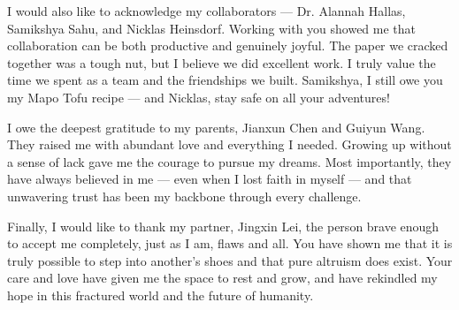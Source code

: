 I would also like to acknowledge my collaborators — Dr. Alannah Hallas, Samikshya Sahu, and Nicklas Heinsdorf. Working with you showed me that collaboration can be both productive and genuinely joyful. The paper we cracked together was a tough nut, but I believe we did excellent work. I truly value the time we spent as a team and the friendships we built. Samikshya, I still owe you my Mapo Tofu recipe — and Nicklas, stay safe on all your adventures!

I owe the deepest gratitude to my parents, Jianxun Chen and Guiyun Wang. They raised me with abundant love and everything I needed. Growing up without a sense of lack gave me the courage to pursue my dreams. Most importantly, they have always believed in me — even when I lost faith in myself — and that unwavering trust has been my backbone through every challenge.

Finally, I would like to thank my partner, Jingxin Lei, the person brave enough to accept me completely, just as I am, flaws and all. You have shown me that it is truly possible to step into another’s shoes and that pure altruism does exist. Your care and love have given me the space to rest and grow, and have rekindled my hope in this fractured world and the future of humanity. 
